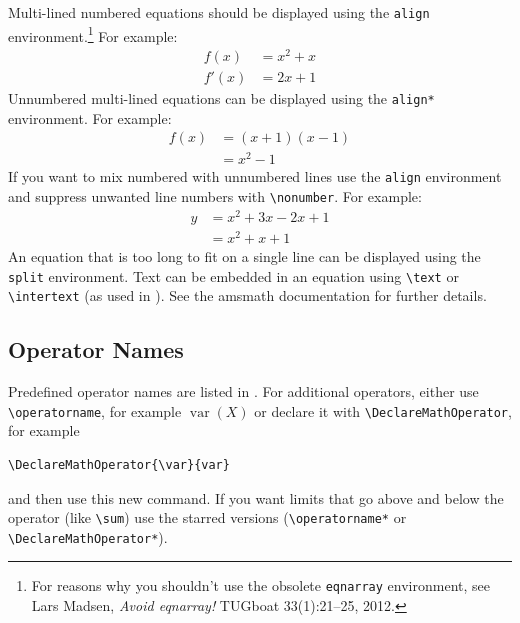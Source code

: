 \documentclass[pmlr,twocolumn,10pt]{jmlr} %
\begin{document}
Multi-lined numbered equations should be displayed using the
\texttt{align} environment.\footnote{For reasons why you 
shouldn't use the obsolete \texttt{eqnarray} environment, see
Lars Madsen, \emph{Avoid eqnarray!} TUGboat 33(1):21--25, 2012.} For example:
\begin{align}
f(x) &= x^2 + x\label{eq:f}\\
f'(x) &= 2x + 1\label{eq:df}
\end{align}
Unnumbered multi-lined equations can be displayed using the
\texttt{align*} environment. For example:
\begin{align*}
f(x) &= (x+1)(x-1)\\
&= x^2 - 1
\end{align*}
If you want to mix numbered with unnumbered lines use the
\texttt{align} environment and suppress unwanted line numbers with
\verb|\nonumber|. For example:
\begin{align}
y &= x^2 + 3x - 2x + 1\nonumber\\
&= x^2 + x + 1\label{eq:y}
\end{align}
An equation that is too long to fit on a single line can be
displayed using the \texttt{split} environment. 
Text can be embedded in an equation using \verb|\text| or
\verb|\intertext| (as used in ).
See the \textsf{amsmath} documentation for further details.

\subsection{Operator Names}
\label{sec:op}

Predefined operator names are listed in .
For additional operators, either use \verb|\operatorname|,
for example $\operatorname{var}(X)$ or declare it with
\verb|\DeclareMathOperator|, for example
\begin{verbatim}
\DeclareMathOperator{\var}{var}
\end{verbatim}
and then use this new command. If you want limits that go above and
below the operator (like \verb|\sum|) use the starred versions
(\verb|\operatorname*| or \verb|\DeclareMathOperator*|).
\end{document}
